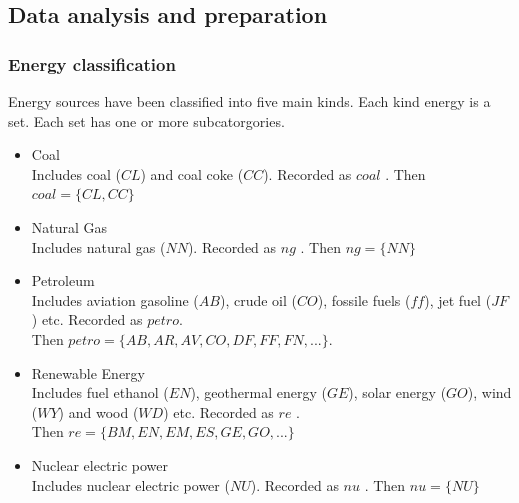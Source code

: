 \documentclass{mcmthesis}
\begin{document}
\subsection{Data analysis and preparation}

\subsubsection{Energy classification}
Energy sources have been classified into five main kinds. Each kind energy is a set. Each set has one or more subcatorgories.
\begin{itemize}
    \item Coal\\
    Includes coal ($CL$) and coal coke ($CC$). Recorded as $coal$ . Then $coal = \{CL, CC\}$
    \item Natural Gas\\
    Includes natural gas ($NN$). Recorded as $ng$ . Then $ng = \{NN\}$
    \item Petroleum\\
    Includes aviation gasoline ($AB$), crude oil ($CO$), fossile fuels ($ff$), jet fuel ($JF$) etc.
    Recorded as $petro$. \\ Then $petro = \{AB, AR, AV, CO, DF, FF, FN, ... \}$.
    \item Renewable Energy\\
    Includes fuel ethanol ($EN$), geothermal energy ($GE$), solar energy ($GO$), wind ($WY$) and wood ($WD$) etc.
    Recorded as $re$ . \\ Then $re = \{BM, EN, EM, ES, GE, GO, ... \}$
    \item Nuclear electric power\\
    Includes nuclear electric power ($NU$). Recorded as $nu$ . Then $nu = \{NU\}$
\end{itemize}
\end{document}
